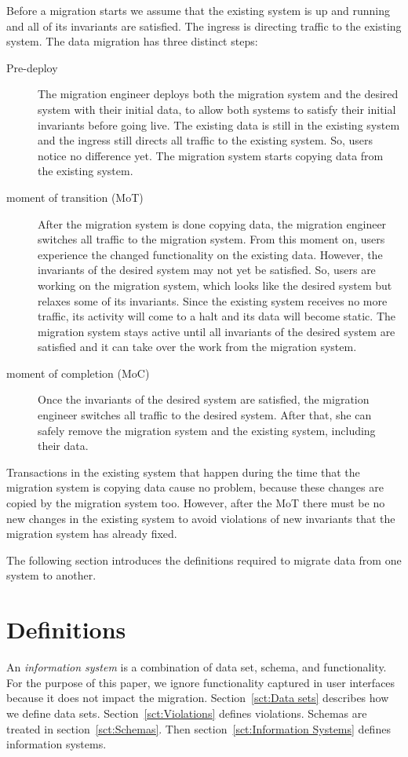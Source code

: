 \documentclass[runningheads]{llncs}
\begin{document}
   Before a migration starts we assume that the existing system is up and running and all of its invariants are satisfied.
   The ingress is directing traffic to the existing system.
   The data migration has three distinct steps:
\begin{description}
\item[Pre-deploy]
      The migration engineer deploys both the migration system and the desired system with their initial data, to allow both systems to satisfy their initial invariants before going live.
      The existing data is still in the existing system and the ingress still directs all traffic to the existing system.
      So, users notice no difference yet.
      The migration system starts copying data from the existing system.
\item[moment of transition (MoT)]
      After the migration system is done copying data, the migration engineer switches all traffic to the migration system.
      From this moment on, users experience the changed functionality on the existing data.
      However, the invariants of the desired system may not yet be satisfied.
      So, users are working on the migration system, which looks like the desired system but relaxes some of its invariants.
      Since the existing system receives no more traffic, its activity will come to a halt and its data will become static.
      The migration system stays active until all invariants of the desired system are satisfied and it can take over the work from the migration system.
\item[moment of completion (MoC)]
      Once the invariants of the desired system are satisfied, the migration engineer switches all traffic to the desired system.
      After that, she can safely remove the migration system and the existing system, including their data.
\end{description}

   Transactions in the existing system that happen during the time that the migration system is copying data cause no problem,
   because these changes are copied by the migration system too.
   However, after the MoT there must be no new changes in the existing system
   to avoid violations of new invariants that the migration system has already fixed.

   The following section introduces the definitions required to migrate data from one system to another.

\section{Definitions}
\label{sct:Definitions}
   An {\em information system} is a combination of data set, schema, and functionality.
   For the purpose of this paper, we ignore functionality captured in user interfaces because it does not impact the migration.
   Section~\ref{sct:Data sets} describes how we define data sets. Section~\ref{sct:Violations} defines violations. Schemas are treated in section~\ref{sct:Schemas}.
   Then section~\ref{sct:Information Systems} defines information systems.
\end{document}
